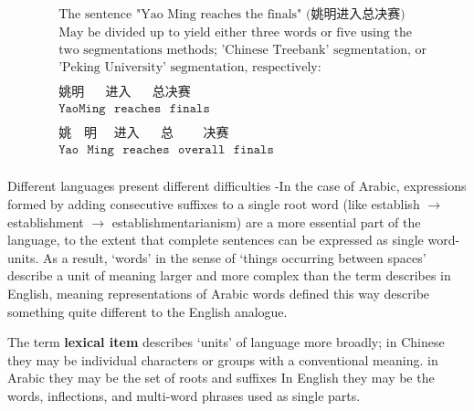 \begin{align*}
&\text{The sentence "Yao Ming reaches the finals" (姚明进入总决赛)}\\
  &\text{May be divided up to yield either three words or five using the }\\
  &\text{two segmentations methods; 'Chinese Treebank' segmentation, or}\\
  &\text{'Peking University' segmentation, respectively:}\\
\\
&\texttt{姚明~~~~~进入~~~~~总决赛~}\\
&\texttt{YaoMing~~reaches~~finals}\\
&\\
&\texttt{姚~~~明~~~~进入~~~~~总~~~~~~~决赛}\\
&\texttt{Yao~~Ming~~reaches~~overall~~finals}\\
\end{align*}

Different languages present different difficulties -In the case of Arabic, expressions formed by adding consecutive suffixes to a single root word (like establish $\to$ establishment $\to$ establishmentarianism) are a more essential part of the language, to the extent that complete sentences can be expressed as single word-units. As a result, `words' in the sense of `things occurring between spaces' describe a unit of meaning larger and more complex than the term describes in English, meaning representations of Arabic words defined this way describe something quite different to the English analogue.

The term \textbf{lexical item} describes `units' of language more broadly; in Chinese they may be individual characters or groups with a conventional meaning. in Arabic they may be the set of roots and suffixes In English they may be the words, inflections, and multi-word phrases used as single parts.

